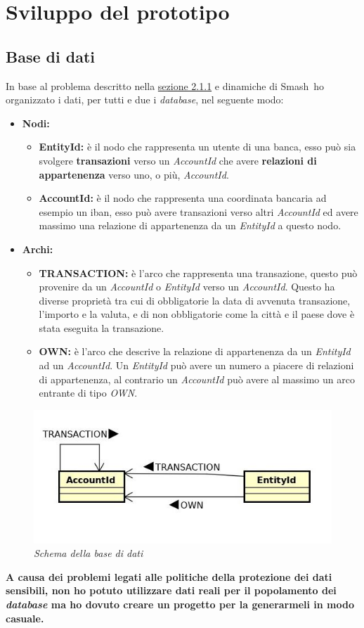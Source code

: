 \section{Sviluppo del prototipo}
\subsection{Base di dati}
In base al problema descritto nella \hyperref[sec:prob]{sezione 2.1.1} e dinamiche di Smash\textregistered\ ho organizzato i dati, per tutti e due i \textit{database}, nel seguente modo:
\begin{itemize}
\item{\textbf{Nodi:}}
\begin{itemize}
\item{\textbf{EntityId:}} è il nodo che rappresenta un utente di una banca, esso può sia svolgere \textbf{transazioni} verso un \textit{AccountId} che avere \textbf{relazioni di appartenenza} verso uno, o più, \textit{AccountId}.
\item{\textbf{AccountId:}} è il nodo che rappresenta una coordinata bancaria ad esempio un iban, esso può avere transazioni verso altri \textit{AccountId} ed avere massimo una relazione di appartenenza da un \textit{EntityId} a questo nodo.
\end{itemize}
\item{\textbf{Archi:}}
\begin{itemize}
\item{\textbf{TRANSACTION:}} è l'arco che rappresenta una transazione, questo può provenire da un \textit{AccountId} o \textit{EntityId} verso un \textit{AccountId}. Questo ha diverse proprietà tra cui di obbligatorie la data di avvenuta transazione, l'importo e la valuta, e di non obbligatorie come la città e il paese dove è stata eseguita la transazione.
\item{\textbf{OWN:}} è l'arco che descrive la relazione di appartenenza da un \textit{EntityId} ad un \textit{AccountId}. Un \textit{EntityId} può avere un numero a piacere di relazioni di appartenenza, al contrario un \textit{AccountId} può avere al massimo un arco entrante di tipo \textit{OWN}.
\end{itemize}
\end{itemize}
\begin{figure}[!ht]
	\centering
	\includegraphics[scale=0.4]{immagini/graph.jpg}
	\caption{\textit{Schema della base di dati}}
\end{figure}
\textbf{A causa dei problemi legati alle politiche della protezione dei dati sensibili, non ho potuto utilizzare dati reali per il popolamento dei \textit{database} ma ho dovuto creare un progetto per la generarmeli in modo casuale.}

